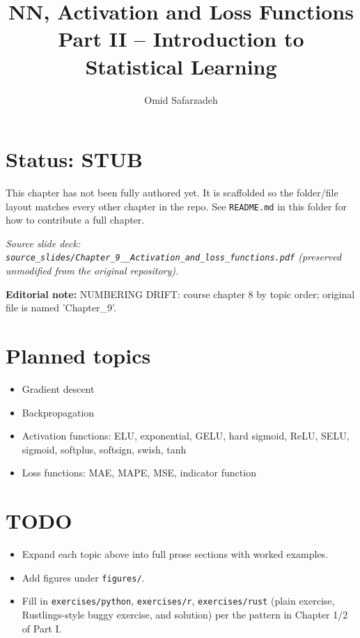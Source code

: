 \documentclass[11pt]{article}
\title{NN, Activation and Loss Functions \\ \large Part II -- Introduction to Statistical Learning}
\author{Omid Safarzadeh}
\date{}
\begin{document}
\maketitle

\section*{Status: STUB}
This chapter has not been fully authored yet. It is scaffolded so the
folder/file layout matches every other chapter in the repo. See
\texttt{README.md} in this folder for how to contribute a full chapter.

\textit{Source slide deck: \texttt{source\_slides/Chapter\_9\_\_Activation\_and\_loss\_functions.pdf} (preserved unmodified from the original repository).}

\par\noindent\textbf{Editorial note:} NUMBERING DRIFT: course chapter 8 by topic order; original file is named 'Chapter\_9'.

\section*{Planned topics}
\begin{itemize}
  \item Gradient descent
  \item Backpropagation
  \item Activation functions: ELU, exponential, GELU, hard sigmoid, ReLU, SELU, sigmoid, softplus, softsign, swish, tanh
  \item Loss functions: MAE, MAPE, MSE, indicator function
\end{itemize}

\section*{TODO}
\begin{itemize}
  \item Expand each topic above into full prose sections with worked examples.
  \item Add figures under \texttt{figures/}.
  \item Fill in \texttt{exercises/python}, \texttt{exercises/r}, \texttt{exercises/rust}
        (plain exercise, Rustlings-style buggy exercise, and solution) per the
        pattern in Chapter 1/2 of Part I.
\end{itemize}
\end{document}
